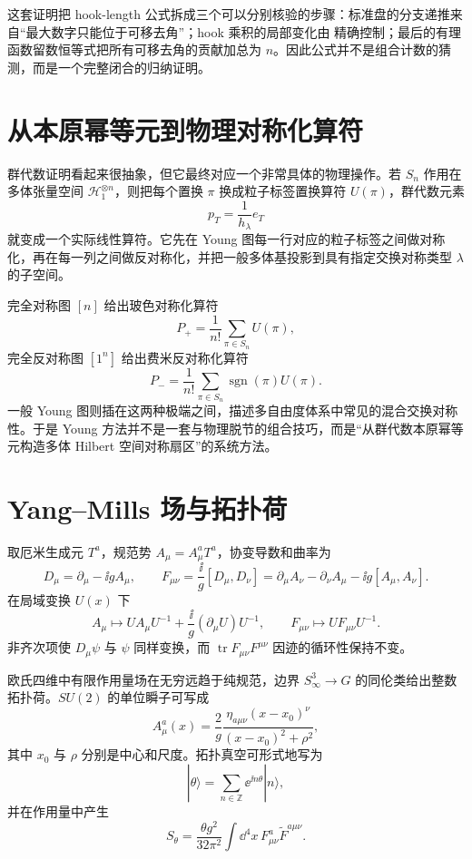 这套证明把 hook-length 公式拆成三个可以分别核验的步骤：标准盘的分支递推来自“最大数字只能位于可移去角”；hook 乘积的局部变化由  精确控制；最后的有理函数留数恒等式把所有可移去角的贡献加总为 $n$。因此公式并不是组合计数的猜测，而是一个完整闭合的归纳证明。

\section{从本原幂等元到物理对称化算符}

群代数证明看起来很抽象，但它最终对应一个非常具体的物理操作。若 $S_n$ 作用在多体张量空间 $\mathcal H_1^{\otimes n}$，则把每个置换 $\pi$ 换成粒子标签置换算符 $U(\pi)$，群代数元素
\[
p_T=\frac1{h_\lambda}e_T
\]
就变成一个实际线性算符。它先在 Young 图每一行对应的粒子标签之间做对称化，再在每一列之间做反对称化，并把一般多体基投影到具有指定交换对称类型 $\lambda$ 的子空间。

完全对称图 $[n]$ 给出玻色对称化算符
\[
P_+=\frac1{n!}\sum_{\pi\in S_n}U(\pi),
\]
完全反对称图 $[1^n]$ 给出费米反对称化算符
\[
P_-=\frac1{n!}\sum_{\pi\in S_n}\operatorname{sgn}(\pi)U(\pi).
\]
一般 Young 图则插在这两种极端之间，描述多自由度体系中常见的混合交换对称性。于是 Young 方法并不是一套与物理脱节的组合技巧，而是“从群代数本原幂等元构造多体 Hilbert 空间对称扇区”的系统方法。

\section{Yang--Mills 场与拓扑荷}

取厄米生成元 $T^a$，规范势 $A_\mu=A_\mu^aT^a$，协变导数和曲率为
\[
D_\mu=\partial_\mu-\ii gA_\mu,
\qquad
F_{\mu\nu}=\frac{\ii}{g}[D_\mu,D_\nu]
=\partial_\mu A_\nu-\partial_\nu A_\mu-\ii g[A_\mu,A_\nu].
\]
在局域变换 $U(x)$ 下
\[
A_\mu\longmapsto
UA_\mu U^{-1}+\frac{\ii}{g}(\partial_\mu U)U^{-1},
\qquad
F_{\mu\nu}\longmapsto UF_{\mu\nu}U^{-1}.
\]
非齐次项使 $D_\mu\psi$ 与 $\psi$ 同样变换，而 $\operatorname{tr}F_{\mu\nu}F^{\mu\nu}$ 因迹的循环性保持不变。

欧氏四维中有限作用量场在无穷远趋于纯规范，边界 $S^3_\infty\to G$ 的同伦类给出整数拓扑荷。$SU(2)$ 的单位瞬子可写成
\[
A_\mu^a(x)=\frac{2}{g}\frac{\eta_{a\mu\nu}(x-x_0)^\nu}
{(x-x_0)^2+\rho^2},
\]
其中 $x_0$ 与 $\rho$ 分别是中心和尺度。拓扑真空可形式地写为
\[
|\theta\rangle=\sum_{n\in\mathbb Z}\ee^{\ii n\theta}|n\rangle,
\]
并在作用量中产生
\[
S_\theta=\frac{\theta g^2}{32\pi^2}
\int\dd^4x\,F^a_{\mu\nu}\widetilde F^{a\mu\nu}.
\]

